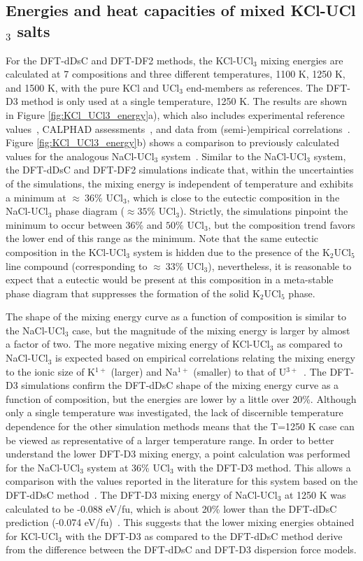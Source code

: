 \documentclass[preprint,3p,10pt,twocolumn,number,sort&compress]{elsarticle}
\begin{document}
\subsection{Energies and heat capacities of mixed KCl-UCl$_3$ salts}
For the DFT-dDsC and DFT-DF2 methods, the KCl-UCl$_3$ mixing energies are calculated at 7 compositions and three different temperatures, 1100 K, 1250 K, and 1500 K, with the pure KCl and UCl$_3$ end-members as references. The DFT-D3 method is only used at a single temperature, 1250 K. The results are shown in Figure \ref{fig:KCl_UCl3_energy}a), which also includes experimental reference values~\cite{Rycerz}, CALPHAD assessments~\cite{YIN2020,Ghosh}, and data from (semi-)empirical correlations~\cite{Pinto}. 
Figure \ref{fig:KCl_UCl3_energy}b) shows a comparison to previously calculated values for the analogous NaCl-UCl$_3$ system~\cite{Andersson}. 
Similar to the NaCl-UCl$_3$ system, the DFT-dDsC and DFT-DF2 simulations indicate that, within the uncertainties of the simulations, the mixing energy is independent of temperature and exhibits a minimum at $\approx~36$\% UCl$_3$, which is close to the eutectic composition in the NaCl-UCl$_3$ phase diagram ($\approx 35$\% UCl$_3$). 
Strictly, the simulations pinpoint the minimum to occur between $36$\% and $50$\% UCl$_3$, but the composition trend favors the lower end of this range as the minimum. Note that the same eutectic composition in the KCl-UCl$_3$ system is hidden due to the presence of the K$_2$UCl$_5$ line compound (corresponding to $\approx~33$\% UCl$_3$), nevertheless, it is reasonable to expect that a eutectic would be present at this composition in a meta-stable phase diagram that suppresses the formation of the solid K$_2$UCl$_5$ phase. 

The shape of the mixing energy curve as a function of composition is similar to the NaCl-UCl$_3$ case, but the magnitude of the mixing energy is larger by almost a factor of two.  
The more negative mixing energy of KCl-UCl$_3$ as compared to NaCl-UCl$_3$ is expected based on empirical correlations relating the mixing energy to the ionic size of K$^{1+}$ (larger) and Na$^{1+}$ (smaller) to that of U$^{3+}$~\cite{YIN2020,Pinto}. The DFT-D3 simulations confirm the DFT-dDsC shape of the mixing energy curve as a function of composition, but the energies are lower by a little over 20\%. 
Although only a single temperature was investigated, the lack of discernible temperature dependence for the other simulation methods means that the T=1250 K case can be viewed as representative of a larger temperature range.
In order to better understand the lower DFT-D3 mixing energy, a point calculation was performed for the NaCl-UCl$_3$ system at 36\% UCl$_3$ with the DFT-D3 method. This allows a comparison with the values reported in the literature for this system based on the DFT-dDsC method~\cite{Andersson}. 
The DFT-D3 mixing energy of NaCl-UCl$_3$ at 1250 K was calculated to be -0.088 eV/fu, which is about 20\% lower than the DFT-dDsC prediction (-0.074 eV/fu)~\cite{Andersson}. This suggests that the lower mixing energies obtained for KCl-UCl$_3$ with the DFT-D3 as compared to the DFT-dDsC method derive from the difference between the DFT-dDsC and DFT-D3 dispersion force models. 
\end{document}
